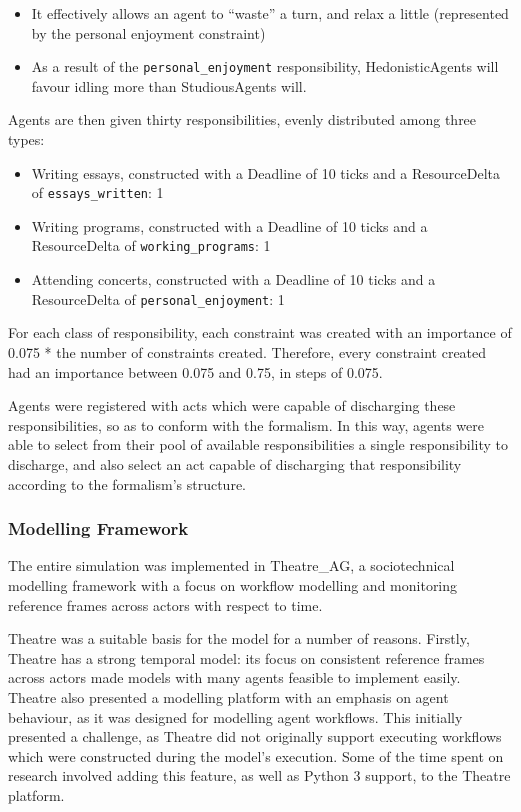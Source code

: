 \begin{itemize}
    \item It effectively allows an agent to ``waste'' a turn, and relax a little (represented by the personal enjoyment constraint)
    \item As a result of the \texttt{personal\_enjoyment} responsibility, HedonisticAgents will favour idling more than StudiousAgents will.
\end{itemize}

Agents are then given thirty responsibilities, evenly distributed among three types:

\begin{itemize}
    \item Writing essays, constructed with a Deadline of 10 ticks and a ResourceDelta of \texttt{essays\_written}: 1
    \item Writing programs, constructed with a Deadline of 10 ticks and a ResourceDelta of \texttt{working\_programs}: 1
    \item Attending concerts, constructed with a Deadline of 10 ticks and a ResourceDelta of \texttt{personal\_enjoyment}: 1
\end{itemize}

For each class of responsibility, each constraint was created with an importance of 0.075 * the number of constraints created. Therefore, every constraint created had an importance between 0.075 and 0.75, in steps of 0.075.\par

Agents were registered with acts which were capable of discharging these responsibilities, so as to conform with the formalism. In this way, agents were able to select from their pool of available responsibilities a single responsibility to discharge, and also select an act capable of discharging that responsibility according to the formalism's structure.\par

\subsubsection{Modelling Framework}\label{subsec:theatre_implementation}
The entire simulation was implemented in Theatre\_AG\cite{theatre_code}, a sociotechnical modelling framework with a focus on workflow modelling and monitoring reference frames across actors with respect to time.\par

Theatre was a suitable basis for the model for a number of reasons. Firstly, Theatre has a strong temporal model: its focus on consistent reference frames across actors made models with many agents feasible to implement easily. Theatre also presented a modelling platform with an emphasis on agent behaviour, as it was designed for modelling agent workflows. This initially presented a challenge, as Theatre did not originally support executing workflows which were constructed during the model's execution. Some of the time spent on research involved adding this feature, as well as Python 3 support, to the Theatre platform.\par

